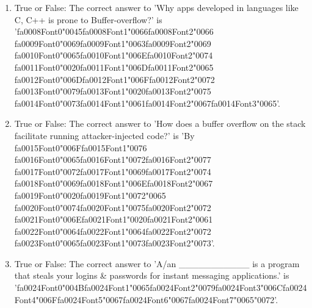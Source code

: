 \documentclass[12pt]{article}
\begin{document}
\begin{enumerate}[label=\arabic*.]
\item True or False: The correct answer to 'Why apps developed in languages like C, C++ is prone to Buffer-overflow?' is '{\csname fa0008Font0\endcsname\char"0045}{\csname fa0008Font1\endcsname\char"0066}{\csname fa0008Font2\endcsname\char"0066} {\csname fa0009Font0\endcsname\char"0069}{\csname fa0009Font1\endcsname\char"0063}{\csname fa0009Font2\endcsname\char"0069} {\csname fa0010Font0\endcsname\char"0065}{\csname fa0010Font1\endcsname\char"006E}{\csname fa0010Font2\endcsname\char"0074} {\csname fa0011Font0\endcsname\char"0020}{\csname fa0011Font1\endcsname\char"006D}{\csname fa0011Font2\endcsname\char"0065} {\csname fa0012Font0\endcsname\char"006D}{\csname fa0012Font1\endcsname\char"006F}{\csname fa0012Font2\endcsname\char"0072} {\csname fa0013Font0\endcsname\char"0079}{\csname fa0013Font1\endcsname\char"0020}{\csname fa0013Font2\endcsname\char"0075} {\csname fa0014Font0\endcsname\char"0073}{\csname fa0014Font1\endcsname\char"0061}{\csname fa0014Font2\endcsname\char"0067}{\csname fa0014Font3\endcsname\char"0065}'.
\item True or False: The correct answer to 'How does a buffer overflow on the stack facilitate running attacker-injected code?' is 'By {\csname fa0015Font0\endcsname\char"006F}{\csname fa0015Font1\endcsname\char"0076} {\csname fa0016Font0\endcsname\char"0065}{\csname fa0016Font1\endcsname\char"0072}{\csname fa0016Font2\endcsname\char"0077} {\csname fa0017Font0\endcsname\char"0072}{\csname fa0017Font1\endcsname\char"0069}{\csname fa0017Font2\endcsname\char"0074} {\csname fa0018Font0\endcsname\char"0069}{\csname fa0018Font1\endcsname\char"006E}{\csname fa0018Font2\endcsname\char"0067} {\csname fa0019Font0\endcsname\char"0020}{\csname fa0019Font1\endcsname\char"0072}{\char"0065} {\csname fa0020Font0\endcsname\char"0074}{\csname fa0020Font1\endcsname\char"0075}{\csname fa0020Font2\endcsname\char"0072} {\csname fa0021Font0\endcsname\char"006E}{\csname fa0021Font1\endcsname\char"0020}{\csname fa0021Font2\endcsname\char"0061} {\csname fa0022Font0\endcsname\char"0064}{\csname fa0022Font1\endcsname\char"0064}{\csname fa0022Font2\endcsname\char"0072} {\csname fa0023Font0\endcsname\char"0065}{\csname fa0023Font1\endcsname\char"0073}{\csname fa0023Font2\endcsname\char"0073}'.
\item True or False: The correct answer to 'A/an \_\_\_\_\_\_\_\_\_\_\_ is a program that steals your logins \& passwords for instant messaging applications.' is '{\csname fa0024Font0\endcsname\char"004B}{\csname fa0024Font1\endcsname\char"0065}{\csname fa0024Font2\endcsname\char"0079}{\csname fa0024Font3\endcsname\char"006C}{\csname fa0024Font4\endcsname\char"006F}{\csname fa0024Font5\endcsname\char"0067}{\csname fa0024Font6\endcsname\char"0067}{\csname fa0024Font7\endcsname\char"0065}{\char"0072}'.

\end{enumerate}
\end{document}
